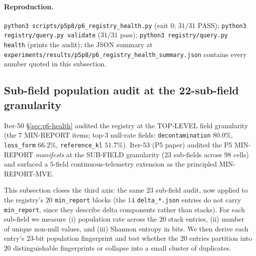 \documentclass{article}
\begin{document}
\paragraph{Reproduction.}
\texttt{python3 scripts/p5p8/p6\_registry\_health.py} (exit $0$;
$31/31$ PASS); \texttt{python3 registry/query.py validate} ($31/31$
pass); \texttt{python3 registry/query.py health} (prints the audit);
the JSON summary at
\texttt{experiments/results/p5p8/p6\_registry\_health\_summary.json}
contains every number quoted in this subsection.

\subsection{Sub-field population audit at the 22-sub-field granularity}
\label{sec:p6-minreport-subfield}

Iter-50 \S\ref{sec:p6-health} audited the registry at the TOP-LEVEL
field granularity (the $7$ MIN-REPORT items; top-3 null-rate fields:
\texttt{decontamination} $80.0\%$, \texttt{loss\_form} $66.2\%$,
\texttt{reference\_kl} $51.7\%$). Iter-53 (P5 paper) audited the P5 MIN-REPORT \emph{manifests} at the
SUB-FIELD granularity ($23$ sub-fields across $98$ cells) and surfaced
a $5$-field continuous-telemetry extension as the principled MIN-REPORT-MVE.

This subsection closes the third axis: the same $23$ sub-field audit,
now applied to the registry's $20$ \texttt{min\_report} blocks (the $14$
\texttt{delta\_*.json} entries do not carry \texttt{min\_report}, since
they describe delta components rather than stacks). For each sub-field
we measure (i) population rate across the $20$ stack entries,
(ii) number of unique non-null values, and (iii) Shannon entropy in
bits. We then derive each entry's $23$-bit population fingerprint and
test whether the $20$ entries partition into $20$ distinguishable
fingerprints or collapse into a small cluster of duplicates.
\end{document}
